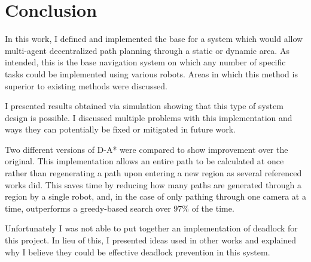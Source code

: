 \section{Conclusion}
In this work, I defined and implemented the base for a system which would allow multi-agent decentralized path planning through a static or dynamic area. As intended, this is the base navigation system on which any number of specific tasks could be implemented using various robots. Areas in which this method is superior to existing methods were discussed.

I presented results obtained via simulation showing that this type of system design is possible. I discussed multiple problems with this implementation and ways they can potentially be fixed or mitigated in future work.

Two different versions of D-A* were compared to show improvement over the original. This implementation allows an entire path to be calculated at once rather than regenerating a path upon entering a new region as several referenced works did. This saves time by reducing how many paths are generated through a region by a single robot, and, in the case of only pathing through one camera at a time, outperforms a greedy-based search over 97\% of the time.

Unfortunately I was not able to put together an implementation of deadlock for this project. In lieu of this, I presented ideas used in other works and explained why I believe they could be effective deadlock prevention in this system.